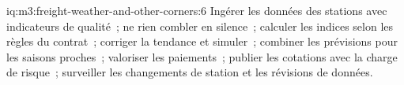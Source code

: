 \begin{solution}{iq:m3:freight-weather-and-other-corners:6}
Ingérer les données des stations avec indicateurs de qualité~; ne rien combler en silence~; calculer les indices selon les règles du contrat~;
corriger la tendance et simuler~; combiner les prévisions pour les saisons proches~; valoriser les paiements~; publier les cotations avec la charge de risque~;
surveiller les changements de station et les révisions de données.
\end{solution}

